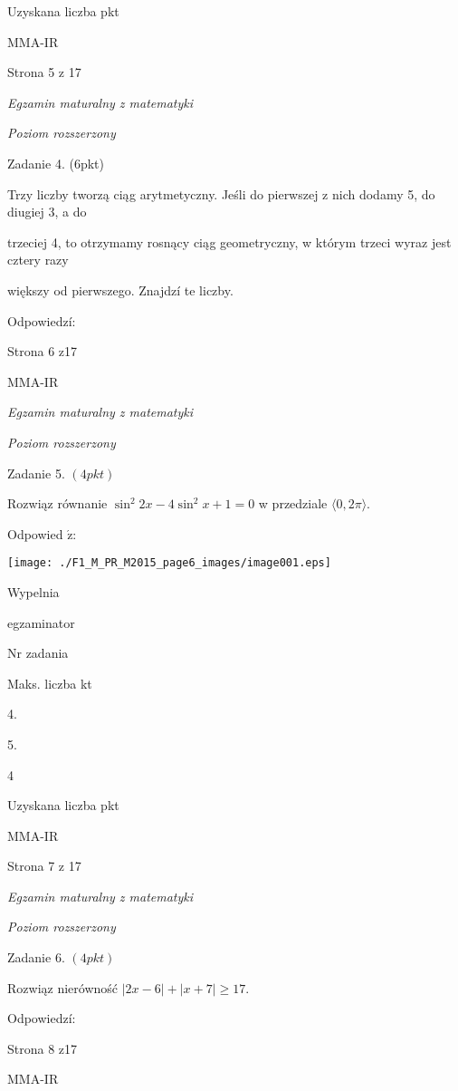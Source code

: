 \documentclass[a4paper,12pt]{article}
\begin{document}
Uzyskana liczba pkt

MMA-IR

Strona 5 z 17





{\it Egzamin maturalny z matematyki}

{\it Poziom rozszerzony}

Zadanie 4. (6pkt)

Trzy liczby tworzą ciąg arytmetyczny. Jeśli do pierwszej z nich dodamy 5, do diugiej 3, a do

trzeciej 4, to otrzymamy rosnący ciąg geometryczny, w którym trzeci wyraz jest cztery razy

większy od pierwszego. Znajdzí te liczby.

Odpowiedzí:

Strona 6 z17

MMA-IR





{\it Egzamin maturalny z matematyki}

{\it Poziom rozszerzony}

Zadanie 5. $(4pkt)$

Rozwiąz równanie $\sin^{2}2x-4\sin^{2}x+1=0$ w przedziale $\langle 0,2\pi\rangle.$

Odpowied $\acute{\mathrm{z}}$:
\begin{center}
\texttt{[image: ./F1\_M\_PR\_M2015\_page6\_images/image001.eps]}
\end{center}
Wypelnia

egzaminator

Nr zadania

Maks. liczba kt

4.

5.

4

Uzyskana liczba pkt

MMA-IR

Strona 7 z 17





{\it Egzamin maturalny z matematyki}

{\it Poziom rozszerzony}

Zadanie 6. $(4pkt)$

Rozwiąz nierówność $|2x-6|+|x+7|\geq 17.$

Odpowiedzí:

Strona 8 z17

MMA-IR
\end{document}
